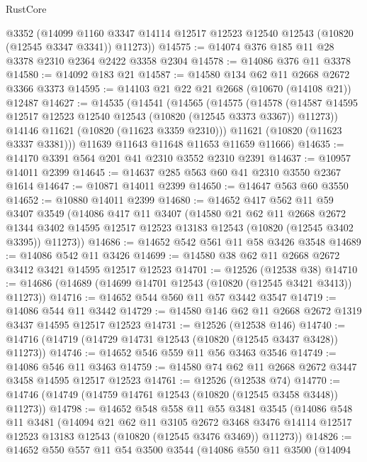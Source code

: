 \begin{lexlean}{RustCore}
\begin{coremodule}
      @3352
      (@14099 @1160 @3347 @14114 @12517 @12523 @12540 @12543 (@10820 (@12545 @3347 @3341)) @11273))
@14575 := @14074 @376 @185 @11 @28 @3378 @2310 @2364 @2422 @3358 @2304
@14578 := @14086 @376 @11 @3378
@14580 := @14092 @183 @21
@14587 := @14580 @134 @62 @11 @2668 @2672 @3366 @3373
@14595 := @14103 @21 @22 @21 @2668 (@10670 (@14108 @21)) @12487
@14627 := @14535
    (@14541
      (@14565
        (@14575
          (@14578 (@14587 @14595 @12517 @12523 @12540 @12543 (@10820 (@12545 @3373 @3367)) @11273))
          @14146
          @11621
          (@10820 (@11623 @3359 @2310)))
        @11621
        (@10820 (@11623 @3337 @3381)))
      @11639
      @11643
      @11648
      @11653
      @11659
      @11666)
@14635 := @14170 @3391 @564 @201 @41 @2310 @3552 @2310 @2391
@14637 := @10957 @14011 @2399
@14645 := @14637 @285 @563 @60 @41 @2310 @3550 @2367 @1614
@14647 := @10871 @14011 @2399
@14650 := @14647 @563 @60 @3550
@14652 := @10880 @14011 @2399
@14680 := @14652
    @417
    @562
    @11
    @59
    @3407
    @3549
    (@14086
      @417
      @11
      @3407
      (@14580
        @21
        @62
        @11
        @2668
        @2672
        @1344
        @3402
        @14595
        @12517
        @12523
        @13183
        @12543
        (@10820 (@12545 @3402 @3395))
        @11273))
@14686 := @14652 @542 @561 @11 @58 @3426 @3548
@14689 := @14086 @542 @11 @3426
@14699 := @14580 @38 @62 @11 @2668 @2672 @3412 @3421 @14595 @12517 @12523
@14701 := @12526 (@12538 @38)
@14710 := @14686 (@14689 (@14699 @14701 @12543 (@10820 (@12545 @3421 @3413)) @11273))
@14716 := @14652 @544 @560 @11 @57 @3442 @3547
@14719 := @14086 @544 @11 @3442
@14729 := @14580 @146 @62 @11 @2668 @2672 @1319 @3437 @14595 @12517 @12523
@14731 := @12526 (@12538 @146)
@14740 := @14716 (@14719 (@14729 @14731 @12543 (@10820 (@12545 @3437 @3428)) @11273))
@14746 := @14652 @546 @559 @11 @56 @3463 @3546
@14749 := @14086 @546 @11 @3463
@14759 := @14580 @74 @62 @11 @2668 @2672 @3447 @3458 @14595 @12517 @12523
@14761 := @12526 (@12538 @74)
@14770 := @14746 (@14749 (@14759 @14761 @12543 (@10820 (@12545 @3458 @3448)) @11273))
@14798 := @14652
    @548
    @558
    @11
    @55
    @3481
    @3545
    (@14086
      @548
      @11
      @3481
      (@14094
        @21
        @62
        @11
        @3105
        @2672
        @3468
        @3476
        @14114
        @12517
        @12523
        @13183
        @12543
        (@10820 (@12545 @3476 @3469))
        @11273))
@14826 := @14652
    @550
    @557
    @11
    @54
    @3500
    @3544
    (@14086
      @550
      @11
      @3500
      (@14094

\end{coremodule}
\end{lexlean}
